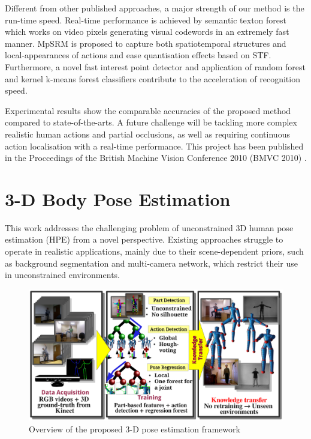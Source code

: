 \documentclass[10pt, a4paper]{article}
\begin{document}
Different from other published approaches, a major strength of our method is the run-time speed. Real-time performance is achieved by semantic texton forest which works on video pixels generating visual codewords in an extremely fast manner. MpSRM is proposed to capture both spatiotemporal structures and local-appearances of actions and ease quantisation effects based on STF. Furthermore, a novel fast interest point detector and application of random forest and kernel k-means forest classifiers contribute to the acceleration of recognition speed. 

Experimental results show the comparable accuracies of the proposed method compared to state-of-the-arts. A future challenge will be tackling more complex realistic human actions and partial occlusions, as well as requiring continuous action localisation with a real-time performance. This project has been published in the Proccedings of the British Machine Vision Conference 2010 (BMVC 2010) \cite{Yu2010}.  

\section{3-D Body Pose Estimation}

This work addresses the challenging problem of unconstrained 3D human pose estimation (HPE) from a novel perspective. Existing approaches struggle to operate in realistic applications, mainly due to their scene-dependent priors, such as background segmentation and multi-camera network, which restrict their use in unconstrained environments.

\begin{figure}[ht]
	\centering
	\includegraphics[width=1\linewidth]{fig/body/figure2_transferexplain.pdf}
	\caption{Overview of the proposed 3-D pose estimation framework} 
	\label{fig/body/transferexplain}
\end{figure}
\end{document}

